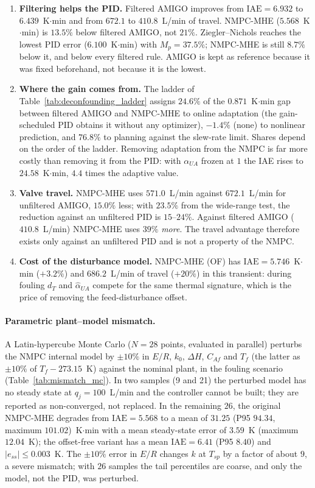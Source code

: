 \begin{enumerate}
    \item \textbf{Filtering helps the PID.} Filtered AMIGO improves from $\mathrm{IAE} = 6.932$ to $6.439$~K$\cdot$min and from $672.1$ to $410.8$~L/min of travel. NMPC-MHE ($5.568$~K$\cdot$min) is $13.5\%$ below filtered AMIGO, not $21\%$. Ziegler--Nichols reaches the lowest PID error ($6.100$~K$\cdot$min) with $M_p = 37.5\%$; NMPC-MHE is still $8.7\%$ below it, and below every filtered rule. AMIGO is kept as reference because it was fixed beforehand, not because it is the lowest.
    \item \textbf{Where the gain comes from.} The ladder of Table~\ref{tab:deconfounding_ladder} assigns $24.6\%$ of the $0.871$~K$\cdot$min gap between filtered AMIGO and NMPC-MHE to online adaptation (the gain-scheduled PID obtains it without any optimizer), $-1.4\%$ (none) to nonlinear prediction, and $76.8\%$ to planning against the slew-rate limit. Shares depend on the order of the ladder. Removing adaptation from the NMPC is far more costly than removing it from the PID: with $\alpha_{UA}$ frozen at $1$ the IAE rises to $24.58$~K$\cdot$min, $4.4$ times the adaptive value.
    \item \textbf{Valve travel.} NMPC-MHE uses $571.0$~L/min against $672.1$~L/min for unfiltered AMIGO, $15.0\%$ less; with $23.5\%$ from the wide-range test, the reduction against an unfiltered PID is $15$--$24\%$. Against filtered AMIGO ($410.8$~L/min) NMPC-MHE uses $39\%$ \emph{more}. The travel advantage therefore exists only against an unfiltered PID and is not a property of the NMPC.
    \item \textbf{Cost of the disturbance model.} NMPC-MHE (OF) has $\mathrm{IAE} = 5.746$~K$\cdot$min ($+3.2\%$) and $686.2$~L/min of travel ($+20\%$) in this transient: during fouling $d_T$ and $\hat\alpha_{UA}$ compete for the same thermal signature, which is the price of removing the feed-disturbance offset.
\end{enumerate}



\paragraph{Parametric plant--model mismatch.} A Latin-hypercube Monte Carlo ($N = 28$ points, evaluated in parallel) perturbs the NMPC internal model by $\pm 10\%$ in $E/R$, $k_0$, $\Delta H$, $C_{Af}$ and $T_f$ (the latter as $\pm 10\%$ of $T_f - 273.15$~K) against the nominal plant, in the fouling scenario (Table~\ref{tab:mismatch_mc}). In two samples (9 and 21) the perturbed model has no steady state at $q_j = 100$~L/min and the controller cannot be built; they are reported as non-converged, not replaced. In the remaining $26$, the original NMPC-MHE degrades from $\mathrm{IAE} = 5.568$ to a mean of $31.25$ (P95 $94.34$, maximum $101.02$)~K$\cdot$min with a mean steady-state error of $3.59$~K (maximum $12.04$~K); the offset-free variant has a mean $\mathrm{IAE} = 6.41$ (P95 $8.40$) and $|e_{ss}| \le 0.003$~K. The $\pm 10\%$ error in $E/R$ changes $k$ at $T_{sp}$ by a factor of about $9$, a severe mismatch; with $26$ samples the tail percentiles are coarse, and only the model, not the PID, was perturbed.

